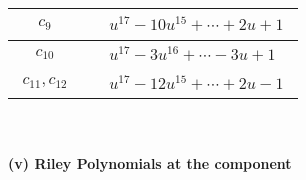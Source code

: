 \documentclass[1p]{elsarticle_modified}
\theoremstyle{definition}
\begin{document}
\begin{tabular}{m{50pt}|m{274pt}}
\hline $$\begin{aligned}c_{9}\end{aligned}$$&$\begin{aligned}
&u^{17}-10 u^{15}+\cdots+2 u+1
\end{aligned}$\\
\hline $$\begin{aligned}c_{10}\end{aligned}$$&$\begin{aligned}
&u^{17}-3 u^{16}+\cdots-3 u+1
\end{aligned}$\\
\hline $$\begin{aligned}c_{11},c_{12}\end{aligned}$$&$\begin{aligned}
&u^{17}-12 u^{15}+\cdots+2 u-1
\end{aligned}$\\
\hline
\end{tabular}\\~\\
\newpage\renewcommand{\arraystretch}{1}
\flushleft \textbf{(v) Riley Polynomials at the component}\newline \\
\end{document}
